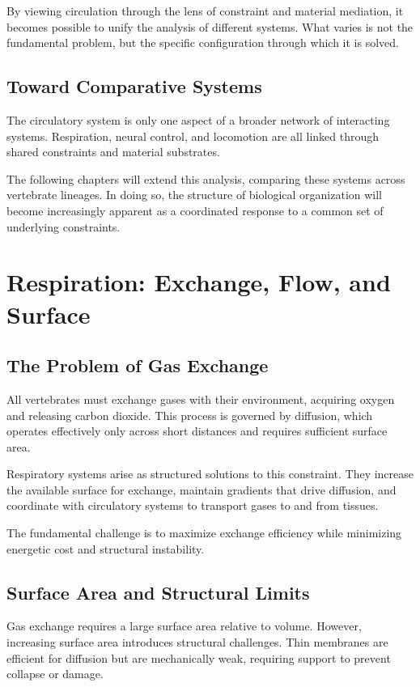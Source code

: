 \documentclass[11pt,oneside]{book}
\begin{document}
By viewing circulation through the lens of constraint and material mediation, it becomes possible to unify the analysis of different systems. What varies is not the fundamental problem, but the specific configuration through which it is solved.

\section{Toward Comparative Systems}

The circulatory system is only one aspect of a broader network of interacting systems. Respiration, neural control, and locomotion are all linked through shared constraints and material substrates.

The following chapters will extend this analysis, comparing these systems across vertebrate lineages. In doing so, the structure of biological organization will become increasingly apparent as a coordinated response to a common set of underlying constraints.

\chapter{Respiration: Exchange, Flow, and Surface}

\section{The Problem of Gas Exchange}

All vertebrates must exchange gases with their environment, acquiring oxygen and releasing carbon dioxide. This process is governed by diffusion, which operates effectively only across short distances and requires sufficient surface area.

Respiratory systems arise as structured solutions to this constraint. They increase the available surface for exchange, maintain gradients that drive diffusion, and coordinate with circulatory systems to transport gases to and from tissues.

The fundamental challenge is to maximize exchange efficiency while minimizing energetic cost and structural instability.

\section{Surface Area and Structural Limits}

Gas exchange requires a large surface area relative to volume. However, increasing surface area introduces structural challenges. Thin membranes are efficient for diffusion but are mechanically weak, requiring support to prevent collapse or damage.
\end{document}
